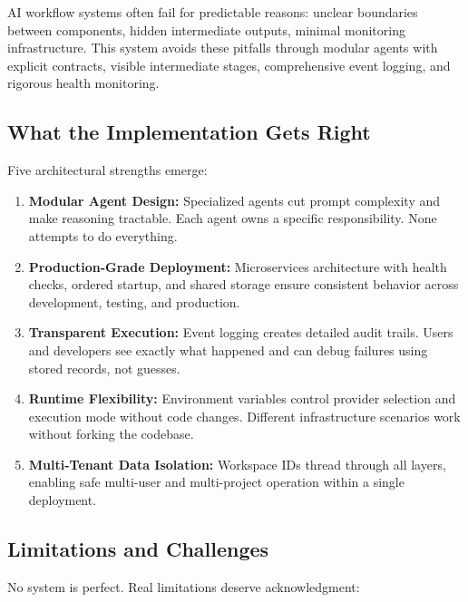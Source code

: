 \documentclass[12pt, a4paper]{article}
\begin{document}
AI workflow systems often fail for predictable reasons: unclear boundaries between components, hidden intermediate outputs, minimal monitoring infrastructure. This system avoids these pitfalls through modular agents with explicit contracts, visible intermediate stages, comprehensive event logging, and rigorous health monitoring.

\subsection{What the Implementation Gets Right}

Five architectural strengths emerge:

\begin{enumerate}[label=\textbf{\alph*.}]
  \item \textbf{Modular Agent Design:} Specialized agents cut prompt complexity and make reasoning tractable. Each agent owns a specific responsibility. None attempts to do everything.
  
  \item \textbf{Production-Grade Deployment:} Microservices architecture with health checks, ordered startup, and shared storage ensure consistent behavior across development, testing, and production.
  
  \item \textbf{Transparent Execution:} Event logging creates detailed audit trails. Users and developers see exactly what happened and can debug failures using stored records, not guesses.
  
  \item \textbf{Runtime Flexibility:} Environment variables control provider selection and execution mode without code changes. Different infrastructure scenarios work without forking the codebase.
  
  \item \textbf{Multi-Tenant Data Isolation:} Workspace IDs thread through all layers, enabling safe multi-user and multi-project operation within a single deployment.
\end{enumerate}

\subsection{Limitations and Challenges}

No system is perfect. Real limitations deserve acknowledgment:
\end{document}
